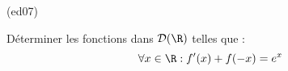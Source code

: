 \begin{tiny}(ed07)\end{tiny}
Déterminer les fonctions dans $\mathcal{D}(\R)$ telles que :
\begin{displaymath}
 \forall x\in \R : f'(x)+f(-x)=e^x
\end{displaymath}
